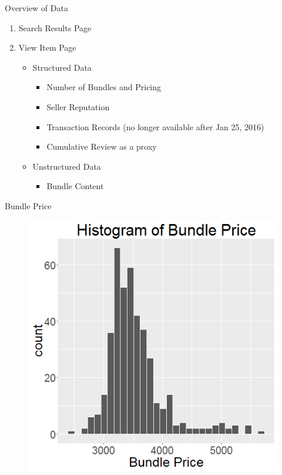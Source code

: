 \documentclass[xcolor=dvipsnames,12pt]{beamer}
\theoremstyle{definition}
\begin{document}
\begin{frame}{Overview of Data}

\begin{enumerate}
\item Search Results Page 
\item View Item Page 
	\begin{itemize}
		\item	Structured Data
		\begin{itemize}
				\item	Number of Bundles and Pricing
				\item	Seller Reputation
					\item	Transaction Records (no longer available after Jan 25, 2016)
					\item	Cumulative Review as a proxy 
		\end{itemize}
		\item	Unstructured Data
				\begin{itemize}
					\item	Bundle Content
					\end{itemize}
	\end{itemize}
\end{enumerate}
\end{frame}

\begin{frame}{Bundle Price}
\begin{figure}
\graphicspath{ {../../0_relative_to_bundle_0/} }
\includegraphics[scale=0.43]{7_z_histogram_bundle_price}
\end{figure}
\end{frame}
\end{document}
